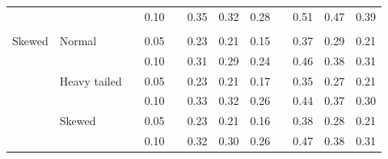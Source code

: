 \documentclass[12pt]{article} %
\begin{document}
\begin{table}[ht]
\begin{scriptsize}
\begin{center}
\begin{tabular}{ll p{.1cm} c p{.1cm} rrr p{.1cm} rrr}
             &              && 0.10 &&   0.35 & 0.32 & 0.28 && 0.51 & 0.47 & 0.39 \\ 
             &&&&&&&&&&&\\
Skewed       & Normal       && 0.05 &&   0.23 & 0.21 & 0.15 && 0.37 & 0.29 & 0.21 \\ 
             &              && 0.10 &&   0.31 & 0.29 & 0.24 && 0.46 & 0.38 & 0.31 \\ 
             & Heavy tailed && 0.05 &&   0.23 & 0.21 & 0.17 && 0.35 & 0.27 & 0.21 \\ 
             &              && 0.10 &&   0.33 & 0.32 & 0.26 && 0.44 & 0.37 & 0.30 \\ 
             & Skewed       && 0.05 &&   0.23 & 0.21 & 0.16 && 0.38 & 0.28 & 0.21 \\ 
             &              && 0.10 &&   0.32 & 0.30 & 0.26 && 0.47 & 0.38 & 0.31 \\ 

\hline
\end{tabular}
\end{center}
\end{scriptsize}
\end{table}
\end{document}
